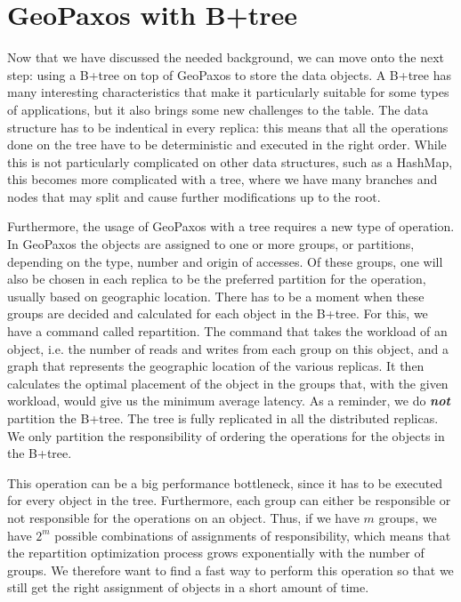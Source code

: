 \chapter{GeoPaxos with B+tree}\label{sec:geopaxos-with-B+tree}
Now that we have discussed the needed background, we can move onto the next step: using a B+tree \citep{b+tree} on top of GeoPaxos to store the data objects. A B+tree has many interesting characteristics that make it particularly suitable for some types of applications, but it also brings some new challenges to the table. The data structure has to be indentical in every replica: this means that all the operations done on the tree have to be deterministic and executed in the right order. While this is not particularly complicated on other data structures, such as a HashMap, this becomes more complicated with a tree, where we have many branches and nodes that may split and cause further modifications up to the root.

Furthermore, the usage of GeoPaxos with a tree requires a new type of operation. In GeoPaxos the objects are assigned to one or more groups, or partitions, depending on the type, number and origin of accesses. Of these groups, one will also be chosen in each replica to be the preferred partition for the operation, usually based on geographic location. There has to be a moment when these groups are decided and calculated for each object in the B+tree. For this, we have a command called repartition. The command that takes the workload of an object, i.e. the number of reads and writes from each group on this object, and a graph that represents the geographic location of the various replicas. It then calculates the optimal placement of the object in the groups that, with the given workload, would give us the minimum average latency. As a reminder, we do \textbf{\emph{not}} partition the B+tree. The tree is fully replicated in all the distributed replicas. We only partition the responsibility of ordering the operations for the objects in the B+tree.

This operation can be a big performance bottleneck, since it has to be executed for every object in the tree. Furthermore, each group can either be responsible or not responsible for the operations on an object. Thus, if we have $m$ groups, we have $2^m$ possible combinations of assignments of responsibility, which means that the repartition optimization process grows exponentially with the number of groups. We therefore want to find a fast way to perform this operation so that we still get the right assignment of objects in a short amount of time.

